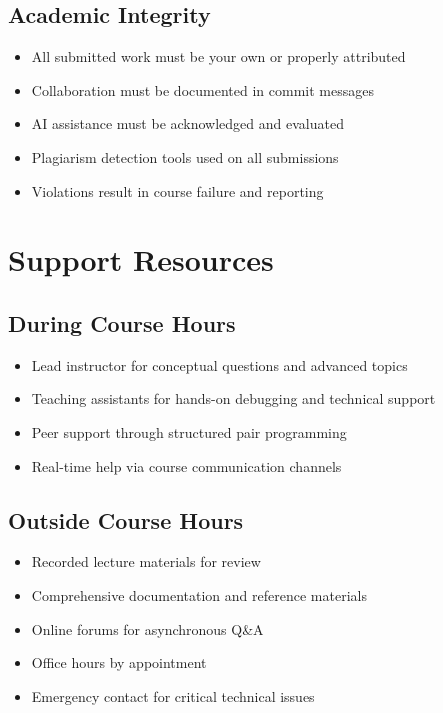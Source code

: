 \documentclass[11pt,a4paper]{article}
\begin{document}
\subsection{Academic Integrity}
\begin{itemize}
    \item All submitted work must be your own or properly attributed
    \item Collaboration must be documented in commit messages
    \item AI assistance must be acknowledged and evaluated
    \item Plagiarism detection tools used on all submissions
    \item Violations result in course failure and reporting
\end{itemize}

\section{Support Resources}

\subsection{During Course Hours}
\begin{itemize}
    \item Lead instructor for conceptual questions and advanced topics
    \item Teaching assistants for hands-on debugging and technical support
    \item Peer support through structured pair programming
    \item Real-time help via course communication channels
\end{itemize}

\subsection{Outside Course Hours}
\begin{itemize}
    \item Recorded lecture materials for review
    \item Comprehensive documentation and reference materials
    \item Online forums for asynchronous Q\&A
    \item Office hours by appointment
    \item Emergency contact for critical technical issues
\end{itemize}
\end{document}
